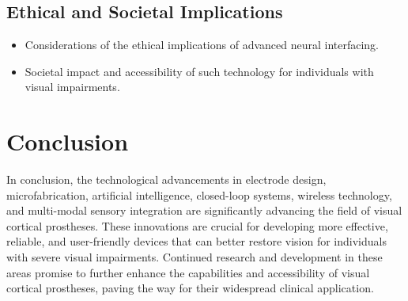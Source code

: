 \documentclass[twocolumn,10pt]{article}
\begin{document}
\subsection{Ethical and Societal Implications}
\begin{itemize}
      \item Considerations of the ethical implications of advanced neural
            interfacing.
      \item Societal impact and accessibility of such technology for individuals
            with visual impairments.
\end{itemize}

\section{Conclusion}\label{sec:conclusion}
In conclusion, the technological advancements in electrode design,
microfabrication, artificial intelligence, closed-loop systems, wireless
technology, and multi-modal sensory integration are significantly advancing the
field of visual cortical prostheses. These innovations are crucial for
developing more effective, reliable, and user-friendly devices that can better
restore vision for individuals with severe visual impairments. Continued
research and development in these areas promise to further enhance the
capabilities and accessibility of visual cortical prostheses, paving the way for
their widespread clinical application.

\printbibliography%
\end{document}
